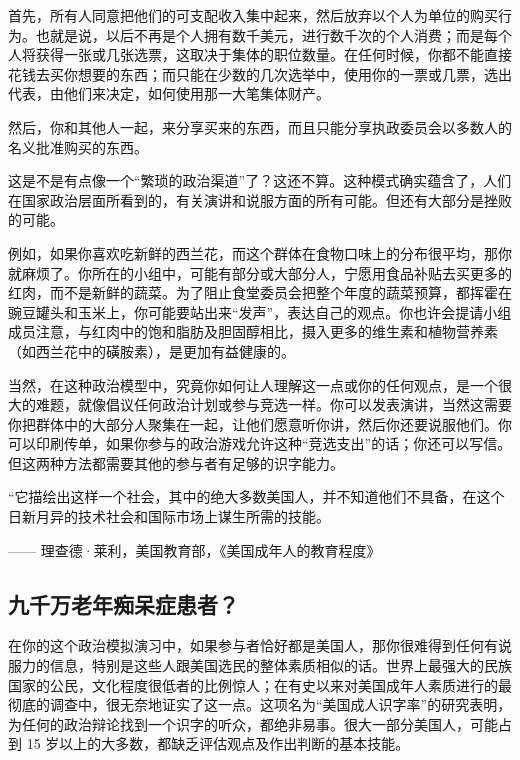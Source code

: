 首先，所有人同意把他们的可支配收入集中起来，然后放弃以个人为单位的购买行为。也就是说，以后不再是个人拥有数千美元，进行数千次的个人消费；而是每个人将获得一张或几张选票，这取决于集体的职位数量。在任何时候，你都不能直接花钱去买你想要的东西；而只能在少数的几次选举中，使用你的一票或几票，选出代表，由他们来决定，如何使用那一大笔集体财产。

然后，你和其他人一起，来分享买来的东西，而且只能分享执政委员会以多数人的名义批准购买的东西。

这是不是有点像一个“繁琐的政治渠道”了？这还不算。这种模式确实蕴含了，人们在国家政治层面所看到的，有关演讲和说服方面的所有可能。但还有大部分是挫败的可能。

例如，如果你喜欢吃新鲜的西兰花，而这个群体在食物口味上的分布很平均，那你就麻烦了。你所在的小组中，可能有部分或大部分人，宁愿用食品补贴去买更多的红肉，而不是新鲜的蔬菜。为了阻止食堂委员会把整个年度的蔬菜预算，都挥霍在豌豆罐头和玉米上，你可能要站出来“发声”，表达自己的观点。你也许会提请小组成员注意，与红肉中的饱和脂肪及胆固醇相比，摄入更多的维生素和植物营养素（如西兰花中的磺胺素），是更加有益健康的。

当然，在这种政治模型中，究竟你如何让人理解这一点或你的任何观点，是一个很大的难题，就像倡议任何政治计划或参与竞选一样。你可以发表演讲，当然这需要你把群体中的大部分人聚集在一起，让他们愿意听你讲，然后你还要说服他们。你可以印刷传单，如果你参与的政治游戏允许这种“竞选支出”的话；你还可以写信。但这两种方法都需要其他的参与者有足够的识字能力。

\begin{tcolorbox}
“它描绘出这样一个社会，其中的绝大多数美国人，并不知道他们不具备，在这个日新月异的技术社会和国际市场上谋生所需的技能。
\begin{flushright}
—— 理查德·莱利，美国教育部，《美国成年人的教育程度》
\end{flushright}
\end{tcolorbox}

\subsection{九千万老年痴呆症患者？}
在你的这个政治模拟演习中，如果参与者恰好都是美国人，那你很难得到任何有说服力的信息，特别是这些人跟美国选民的整体素质相似的话。世界上最强大的民族国家的公民，文化程度很低者的比例惊人；在有史以来对美国成年人素质进行的最彻底的调查中，很无奈地证实了这一点。这项名为“美国成人识字率”的研究表明，为任何的政治辩论找到一个识字的听众，都绝非易事。很大一部分美国人，可能占到 15 岁以上的大多数，都缺乏评估观点及作出判断的基本技能。

